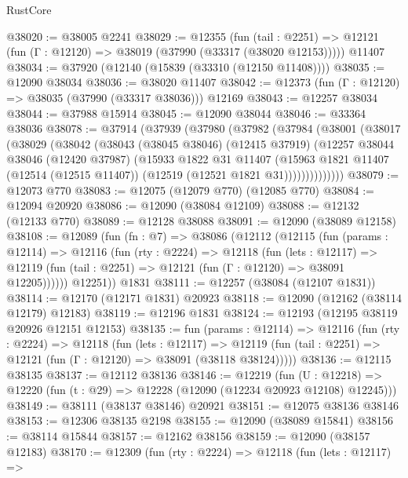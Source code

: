 \begin{lexlean}{RustCore}
\begin{coremodule}
@38020 := @38005 @2241
@38029 := @12355
    (fun (tail : @2251) => @12121 (fun (Γ : @12120) => @38019 (@37990 (@33317 (@38020 @12153)))))
    @11407
@38034 := @37920 (@12140 (@15839 (@33310 (@12150 @11408))))
@38035 := @12090 @38034
@38036 := @38020 @11407
@38042 := @12373 (fun (Γ : @12120) => @38035 (@37990 (@33317 @38036))) @12169
@38043 := @12257 @38034
@38044 := @37988 @15914
@38045 := @12090 @38044
@38046 := @33364 @38036
@38078 := @37914
    (@37939
      (@37980
        (@37982
          (@37984
            (@38001
              (@38017
                (@38029
                  (@38042
                    (@38043
                      (@38045 @38046)
                      (@12415 @37919)
                      (@12257
                        @38044
                        @38046
                        (@12420 @37987)
                        (@15933
                          @1822
                          @31
                          @11407
                          (@15963
                            @1821
                            @11407
                            (@12514 (@12515 @11407))
                            (@12519 (@12521 @1821 @31))))))))))))))
@38079 := @12073 @770
@38083 := @12075 (@12079 @770) (@12085 @770)
@38084 := @12094 @20920
@38086 := @12090 (@38084 @12109)
@38088 := @12132 (@12133 @770)
@38089 := @12128 @38088
@38091 := @12090 (@38089 @12158)
@38108 := @12089
    (fun (fn : @7) =>
    @38086
      (@12112
        (@12115
          (fun (params : @12114) =>
          @12116
            (fun (rty : @2224) =>
            @12118
              (fun (lets : @12117) =>
              @12119 (fun (tail : @2251) => @12121 (fun (Γ : @12120) => @38091 @12205))))))
        @12251))
    @1831
@38111 := @12257 (@38084 (@12107 @1831))
@38114 := @12170 (@12171 @1831) @20923
@38118 := @12090 (@12162 (@38114 @12179) @12183)
@38119 := @12196 @1831
@38124 := @12193 (@12195 @38119 @20926 @12151 @12153)
@38135 := fun (params : @12114) =>
  @12116
    (fun (rty : @2224) =>
    @12118
      (fun (lets : @12117) =>
      @12119 (fun (tail : @2251) => @12121 (fun (Γ : @12120) => @38091 (@38118 @38124)))))
@38136 := @12115 @38135
@38137 := @12112 @38136
@38146 := @12219
    (fun (U : @12218) => @12220 (fun (t : @29) => @12228 (@12090 (@12234 @20923 @12108) @12245)))
@38149 := @38111 (@38137 @38146) @20921
@38151 := @12075 @38136 @38146
@38153 := @12306 @38135 @2198
@38155 := @12090 (@38089 @15841)
@38156 := @38114 @15844
@38157 := @12162 @38156
@38159 := @12090 (@38157 @12183)
@38170 := @12309
    (fun (rty : @2224) =>
    @12118
      (fun (lets : @12117) =>

\end{coremodule}
\end{lexlean}
